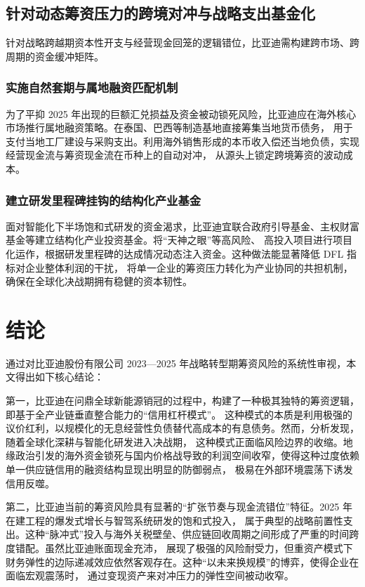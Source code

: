 \documentclass[12pt,a4paper,fontset=windows,UTF8]{ctexart}
\begin{document}
\subsection{针对动态筹资压力的跨境对冲与战略支出基金化}

针对战略跨越期资本性开支与经营现金回笼的逻辑错位，比亚迪需构建跨市场、跨周期的资金缓冲矩阵。

\subsubsection{实施自然套期与属地融资匹配机制}

为了平抑 2025 年出现的巨额汇兑损益及资金被动锁死风险，比亚迪应在海外核心市场推行属地融资策略。在泰国、巴西等制造基地直接筹集当地货币债务，
  用于支付当地工厂建设与采购支出。利用海外销售形成的本币收入偿还当地负债，实现经营现金流与筹资现金流在币种上的自动对冲，
  从源头上锁定跨境筹资的波动成本。

\subsubsection{建立研发里程碑挂钩的结构化产业基金}

面对智能化下半场饱和式研发的资金渴求，比亚迪宜联合政府引导基金、主权财富基金等建立结构化产业投资基金。将“天神之眼”等高风险、
  高投入项目进行项目化运作，根据研发里程碑的达成情况动态注入资金。这种做法能显著降低 DFL 指标对企业整体利润的干扰，
  将单一企业的筹资压力转化为产业协同的共担机制，确保在全球化决战期拥有稳健的资本韧性。

\section{结论}

通过对比亚迪股份有限公司 2023—2025 年战略转型期筹资风险的系统性审视，本文得出如下核心结论：

第一，比亚迪在问鼎全球新能源销冠的过程中，构建了一种极其独特的筹资逻辑，即基于全产业链垂直整合能力的“信用杠杆模式”。
  这种模式的本质是利用极强的议价红利，以规模化的无息经营性负债替代高成本的有息债务。然而，分析发现，随着全球化深耕与智能化研发进入决战期，
  这种模式正面临风险边界的收缩。地缘政治引发的海外资金锁死与国内价格战导致的利润空间收窄，使得这种过度依赖单一供应链信用的融资结构显现出明显的防御弱点，
  极易在外部环境震荡下诱发信用反噬。

第二，比亚迪当前的筹资风险具有显著的“扩张节奏与现金流错位”特征。2025 年在建工程的爆发式增长与智驾系统研发的饱和式投入，
  属于典型的战略前置性支出。这种“脉冲式”投入与海外关税壁垒、供应链回收周期之间形成了严重的时间跨度错配。虽然比亚迪账面现金充沛，
  展现了极强的风险耐受力，但重资产模式下财务弹性的边际递减效应依然客观存在。这种“以未来换规模”的博弈，使得企业在面临宏观震荡时，
  通过变现资产来对冲压力的弹性空间被动收窄。
\end{document}
